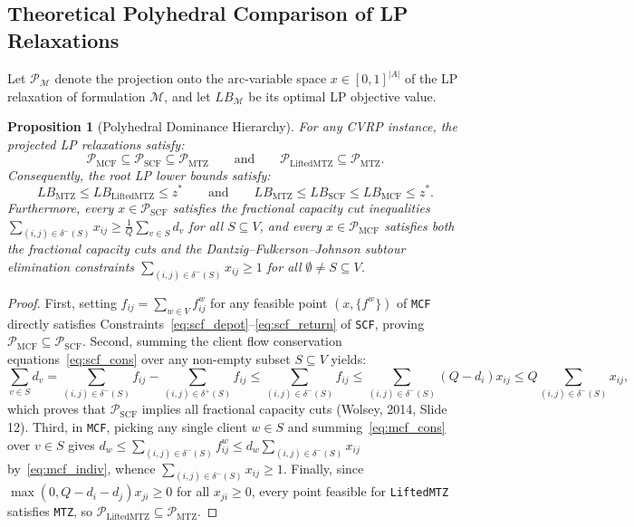 \documentclass[11pt,a4paper]{article}
\newtheorem{proposition}{Proposition}
\begin{document}
\subsection{Theoretical Polyhedral Comparison of LP Relaxations}
Let $\mathcal{P}_{\mathcal{M}}$ denote the projection onto the arc-variable space $x \in [0, 1]^{|A|}$ of the LP relaxation of formulation $\mathcal{M}$, and let $LB_{\mathcal{M}}$ be its optimal LP objective value.

\begin{proposition}[Polyhedral Dominance Hierarchy]
For any CVRP instance, the projected LP relaxations satisfy:
\[
\mathcal{P}_{\text{MCF}} \subseteq \mathcal{P}_{\text{SCF}} \subseteq \mathcal{P}_{\text{MTZ}} \qquad \text{and} \qquad \mathcal{P}_{\text{LiftedMTZ}} \subseteq \mathcal{P}_{\text{MTZ}}.
\]
Consequently, the root LP lower bounds satisfy:
\[
LB_{\text{MTZ}} \le LB_{\text{LiftedMTZ}} \le z^* \qquad \text{and} \qquad LB_{\text{MTZ}} \le LB_{\text{SCF}} \le LB_{\text{MCF}} \le z^*.
\]
Furthermore, every $x \in \mathcal{P}_{\text{SCF}}$ satisfies the fractional capacity cut inequalities $\sum_{(i,j) \in \delta^-(S)} x_{ij} \ge \frac{1}{Q}\sum_{v \in S} d_v$ for all $S \subseteq V$, and every $x \in \mathcal{P}_{\text{MCF}}$ satisfies both the fractional capacity cuts and the Dantzig--Fulkerson--Johnson subtour elimination constraints $\sum_{(i,j) \in \delta^-(S)} x_{ij} \ge 1$ for all $\emptyset \neq S \subseteq V$.
\end{proposition}
\begin{proof}
First, setting $f_{ij} = \sum_{w \in V} f_{ij}^w$ for any feasible point $(x, \{f^w\})$ of \texttt{MCF} directly satisfies Constraints~\eqref{eq:scf_depot}--\eqref{eq:scf_return} of \texttt{SCF}, proving $\mathcal{P}_{\text{MCF}} \subseteq \mathcal{P}_{\text{SCF}}$. Second, summing the client flow conservation equations~\eqref{eq:scf_cons} over any non-empty subset $S \subseteq V$ yields:
\[
\sum_{v \in S} d_v = \sum_{(i,j) \in \delta^-(S)} f_{ij} - \sum_{(i,j) \in \delta^+(S)} f_{ij} \le \sum_{(i,j) \in \delta^-(S)} f_{ij} \le \sum_{(i,j) \in \delta^-(S)} (Q - d_i) x_{ij} \le Q \sum_{(i,j) \in \delta^-(S)} x_{ij},
\]
which proves that $\mathcal{P}_{\text{SCF}}$ implies all fractional capacity cuts (Wolsey, 2014, Slide 12). Third, in \texttt{MCF}, picking any single client $w \in S$ and summing~\eqref{eq:mcf_cons} over $v \in S$ gives $d_w \le \sum_{(i,j) \in \delta^-(S)} f_{ij}^w \le d_w \sum_{(i,j) \in \delta^-(S)} x_{ij}$ by~\eqref{eq:mcf_indiv}, whence $\sum_{(i,j) \in \delta^-(S)} x_{ij} \ge 1$. Finally, since $\max(0, Q - d_i - d_j) x_{ji} \ge 0$ for all $x_{ji} \ge 0$, every point feasible for \texttt{LiftedMTZ} satisfies \texttt{MTZ}, so $\mathcal{P}_{\text{LiftedMTZ}} \subseteq \mathcal{P}_{\text{MTZ}}$.
\end{proof}
\end{document}
